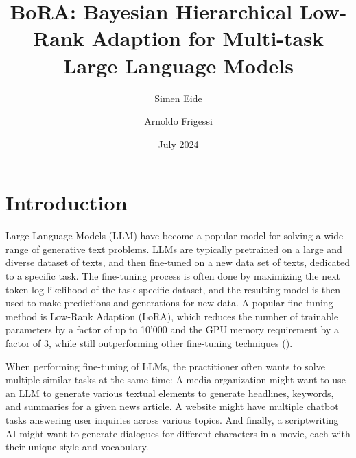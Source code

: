 \documentclass[fullpaper]{nldl}
\title{BoRA: Bayesian Hierarchical  Low-Rank Adaption for Multi-task Large Language Models}
\author[1]{Simen Eide}
\author[2]{Arnoldo Frigessi}
\affil[1]{University of Oslo, Schibsted}
\affil[1]{University of Oslo}
\date{July 2024}
\begin{document}
\maketitle
{}

\section{Introduction}
Large Language Models (LLM) have become a popular model for solving a wide range of generative text problems. LLMs are typically pretrained on a large and diverse dataset of texts, and then fine-tuned on a new data set of texts, dedicated to a specific task. The fine-tuning process is often done by maximizing the next token log likelihood of the task-specific dataset, and the resulting model is then used to make predictions and generations for new data. A popular fine-tuning method is Low-Rank Adaption (LoRA), which reduces the number of trainable parameters by a factor of up to 10'000 and the GPU memory requirement by a factor of 3, while still outperforming other fine-tuning techniques (\cite{hu_lora_2022}).

When performing fine-tuning of LLMs, the practitioner often wants to solve multiple similar tasks at the same time: 
A media organization might want to use an LLM to generate various textual elements to generate headlines, keywords, and summaries for a given news article. 
A website might have multiple chatbot tasks answering user inquiries across various topics.
And finally, a scriptwriting AI might want to generate dialogues for different characters in a movie, each with their unique style and vocabulary.
\end{document}
